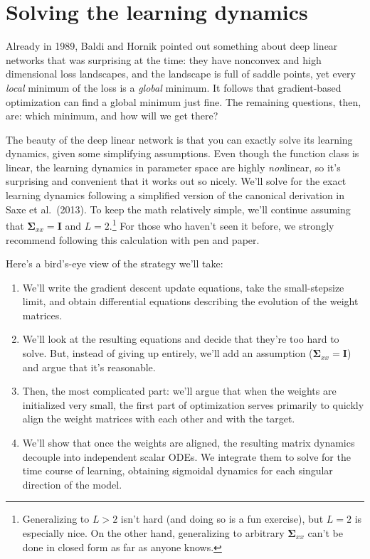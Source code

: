 \documentclass[12pt]{article}
\newcommand{\mI}{\mathbf{I}}
\newcommand{\mSigma}{\boldsymbol{\Sigma}}
\begin{document}
\section{Solving the learning dynamics}

Already in 1989, Baldi and Hornik pointed out something about deep linear networks that was surprising at the time: they have nonconvex and high dimensional loss landscapes, and the landscape is full of saddle points, yet every \emph{local} minimum of the loss is a \emph{global} minimum. It follows that gradient-based optimization can find a global minimum just fine. The remaining questions, then, are: which minimum, and how will we get there?

The beauty of the deep linear network is that you can exactly solve its learning dynamics, given some simplifying assumptions. Even though the function class is linear, the learning dynamics in parameter space are highly \emph{non}linear, so it's surprising and convenient that it works out so nicely. We'll solve for the exact learning dynamics following a simplified version of the canonical derivation in Saxe et al.\ (2013). To keep the math relatively simple, we'll continue assuming that $\mSigma_{xx} = \mI$ and $L = 2$.\footnote{Generalizing to $L > 2$ isn't hard (and doing so is a fun exercise), but $L = 2$ is especially nice. On the other hand, generalizing to arbitrary $\mSigma_{xx}$ can't be done in closed form as far as anyone knows.} For those who haven't seen it before, we strongly recommend following this calculation with pen and paper.

Here's a bird's-eye view of the strategy we'll take:

\begin{enumerate}
    \item We'll write the gradient descent update equations, take the small-stepsize limit, and obtain differential equations describing the evolution of the weight matrices.
    \item We'll look at the resulting equations and decide that they're too hard to solve. But, instead of giving up entirely, we'll add an assumption ($\mSigma_{xx}=\mI$) and argue that it's reasonable.
    \item Then, the most complicated part: we'll argue that when the weights are initialized very small, the first part of optimization serves primarily to quickly align the weight matrices with each other and with the target.
    \item We'll show that once the weights are aligned, the resulting matrix dynamics decouple into independent scalar ODEs. We integrate them to solve for the time course of learning, obtaining sigmoidal dynamics for each singular direction of the model.
\end{enumerate}
\end{document}
